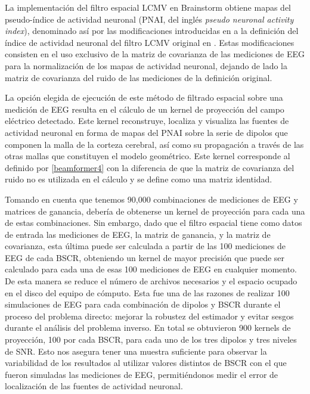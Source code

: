 La implementación del filtro espacial LCMV en Brainstorm obtiene mapas del pseudo-índice de actividad neuronal (PNAI, del inglés \emph{pseudo neuronal activity index}), denominado así por las modificaciones introducidas en \cite{Jaiswal2020} a la definición del índice de actividad neuronal del filtro LCMV original en \cite{VanVeen1997}.
Estas modificaciones consisten en el uso exclusivo de la matriz de covarianza de las mediciones de EEG para la normalización de los mapas de actividad neuronal, dejando de lado la matriz de covarianza del ruido de las mediciones de la definición original.

La opción elegida de ejecución de este método de filtrado espacial sobre una medición de EEG resulta en el cálculo de un kernel de proyección del campo eléctrico detectado.
Este kernel reconstruye, localiza y visualiza las fuentes de actividad neuronal en forma de mapas del PNAI sobre la serie de dipolos que componen la malla de la corteza cerebral, así como su propagación a través de las otras mallas que constituyen el modelo geométrico.
Este kernel corresponde al definido por \cref{beamformer4} con la diferencia de que la matriz de covarianza del ruido no es utilizada en el cálculo y se define como una matriz identidad.

Tomando en cuenta que tenemos 90,000 combinaciones de mediciones de EEG y matrices de ganancia, debería de obtenerse un kernel de proyección para cada una de estas combinaciones.
Sin embargo, dado que el filtro espacial tiene como datos de entrada las mediciones de EEG, la matriz de ganancia, y la matriz de covarianza, esta última puede ser calculada a partir de las 100 mediciones de EEG de cada BSCR, obteniendo un kernel de mayor precisión que puede ser calculado para cada una de esas 100 mediciones de EEG en cualquier momento. 
De esta manera se reduce el número de archivos necesarios y el espacio ocupado en el disco del equipo de cómputo.
Esta fue una de las razones de realizar 100 simulaciones de EEG para cada combinación de dipolos y BSCR durante el proceso del problema directo: mejorar la robustez del estimador y evitar sesgos durante el análisis del problema inverso.
En total se obtuvieron 900 kernels de proyección, 100 por cada BSCR, para cada uno de los tres dipolos y tres niveles de SNR.
Esto nos asegura tener una muestra suficiente para observar la variabilidad de los resultados al utilizar valores distintos de BSCR con el que fueron simuladas las mediciones de EEG, permitiéndonos medir el error de localización de las fuentes de actividad neuronal.


